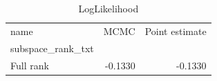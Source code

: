 \begin{table}[H]
\caption{LogLikelihood}
\begin{tabular}{lrr}
\toprule
name & MCMC & Point estimate \\
subspace_rank_txt &  &  \\
\midrule
Full rank & -0.1330 & -0.1330 \\
\bottomrule
\end{tabular}
\end{table}
